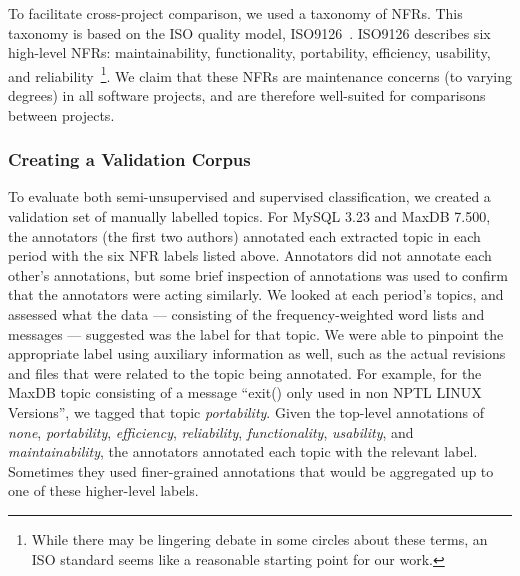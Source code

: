 \documentclass[smallextended]{svjour3}       %
\begin{document}

To facilitate cross-project comparison, we used a taxonomy of NFRs. This taxonomy is based on the ISO quality model, ISO9126~\cite{iso9126}. 
ISO9126 describes six high-level NFRs: maintainability, functionality,
portability, efficiency, usability, and reliability~\footnote{While there may be lingering debate in some circles about these terms, an ISO standard seems like a reasonable starting point for our work.}.
We claim that these NFRs are maintenance concerns (to varying degrees) in all software projects, and are therefore well-suited for comparisons between projects.



\subsubsection{Creating a Validation Corpus}
To evaluate both semi-unsupervised and supervised classification, we
created a validation set of manually labelled topics. For MySQL 3.23
and MaxDB 7.500, the annotators (the first two authors) annotated each extracted topic in each period with
the six NFR labels listed above.
Annotators did not annotate each other's annotations, but some brief
inspection of annotations was used to confirm that the annotators were
acting similarly.
We looked at each period's topics, and assessed what the data ---
consisting of the frequency-weighted word lists and messages ---
suggested was the label for that topic. 
We were able to pinpoint the appropriate label using auxiliary information as well, such as the actual revisions and files that were related to the topic being annotated.
For example, for the MaxDB topic consisting of a message ``exit() only
used in non NPTL LINUX Versions'', we tagged that topic
\emph{portability}. 
Given the top-level annotations of \emph{none}, \emph{portability},
\emph{efficiency}, \emph{reliability}, \emph{functionality},
\emph{usability}, and \emph{maintainability}, the annotators annotated each topic
with the relevant label. Sometimes they used finer-grained
annotations that would be aggregated up to one of these higher-level labels.
\end{document}
